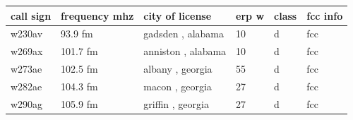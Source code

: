 \documentclass{article}
\begin{document}
\begin{tabular}{llllll}
\toprule
call sign & frequency mhz & city of license & erp w & class & fcc info \\
\midrule
w230av & 93.9 fm & gadsden , alabama & 10 & d & fcc \\
w269ax & 101.7 fm & anniston , alabama & 10 & d & fcc \\
w273ae & 102.5 fm & albany , georgia & 55 & d & fcc \\
w282ae & 104.3 fm & macon , georgia & 27 & d & fcc \\
w290ag & 105.9 fm & griffin , georgia & 27 & d & fcc \\
\bottomrule
\end{tabular}
\end{document}
